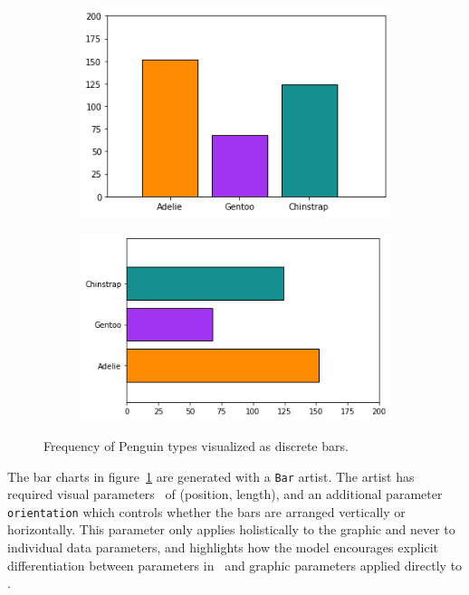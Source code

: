 \documentclass[../main.tex]{subfiles}
\begin{document}
\begin{figure}[H]
    \begin{subfigure}{0.49\textwidth}
        \includegraphics[width=\textwidth]{figures/code/bar_v.png}
    \end{subfigure}
    \begin{subfigure}{0.49\textwidth}
        \includegraphics[width=\textwidth]{figures/code/bar_h.png}
    \end{subfigure}
    \caption{Frequency of Penguin types visualized as discrete bars. }
    \label{fig:code_bar_simple}
\end{figure}
The bar charts in figure~\ref{fig:code_bar_simple} are generated with a \texttt{Bar} artist. The artist has required visual parameters \vfiber\ of (position, length), and an additional parameter \texttt{orientation} which controls whether the bars are arranged vertically or horizontally. This parameter only applies holistically to the graphic and never to individual data parameters, and highlights how the model encourages explicit differentiation between parameters in \vtotal\ and graphic parameters applied directly to \vmarkd. 
\end{document}
